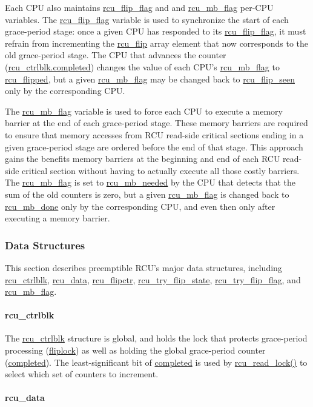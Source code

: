 Each CPU also maintains \url{rcu_flip_flag} and
and \url{rcu_mb_flag} per-CPU variables.
The \url{rcu_flip_flag} variable is used to synchronize the
start of each grace-period stage: once a given CPU has responded
to its \url{rcu_flip_flag}, it must refrain from incrementing
the \url{rcu_flip} array element that now corresponds to
the old grace-period stage.
The CPU that advances the counter (\url{rcu_ctrlblk.completed})
changes the value of each CPU's \url{rcu_mb_flag} to
\url{rcu_flipped}, but a given \url{rcu_mb_flag}
may be changed back to \url{rcu_flip_seen} only by
the corresponding CPU.

The \url{rcu_mb_flag} variable is used to force each CPU to
execute a memory barrier at the end of each grace-period stage.
These memory barriers are required to ensure that memory accesses from
RCU read-side critical sections ending in a given grace-period stage
are ordered before the end of that stage.
This approach gains the benefits memory barriers at the
beginning and end of each RCU read-side critical section without
having to actually execute all those costly barriers.
The \url{rcu_mb_flag} is set to \url{rcu_mb_needed} by
the CPU that detects that the sum of the old counters is zero,
but a given \url{rcu_mb_flag} is changed back to
\url{rcu_mb_done} only by the corresponding CPU, and even
then only after executing a memory barrier.

\subsubsection{Data Structures}
\label{app:rcuimpl:Data Structures}

This section describes preemptible RCU's major data structures, including
\url{rcu_ctrlblk}, \url{rcu_data}, \url{rcu_flipctr},
\url{rcu_try_flip_state}, \url{rcu_try_flip_flag}, and
\url{rcu_mb_flag}.

\paragraph{rcu_ctrlblk}
\label{app:rcuimpl:rcu_ctrlblk}

The \url{rcu_ctrlblk} structure is global, and holds the lock
that protects grace-period processing (\url{fliplock}) as well
as holding the global grace-period counter (\url{completed}).
The least-significant bit of \url{completed} is used by
\url{rcu_read_lock()} to select which set of counters to increment.

\paragraph{rcu_data}
\label{app:rcuimpl:rcu_data}

